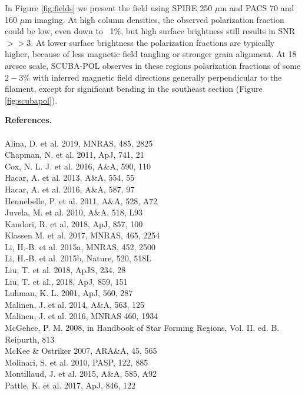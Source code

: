 \documentclass[11pt]{amsart}
\begin{document}
{In Figure \ref{fig:fields} we present the field using SPIRE 250 $\mu$m and PACS 70 and 160 $\mu$m imaging. At high column densities, the observed polarization fraction could be low, even down to ~1\%, but high surface brightness still results in SNR$>>$3. At lower surface brightness the polarization fractions are typically higher, because of less magnetic field tangling or stronger grain alignment. At 18 arcsec scale, SCUBA-POL observes in these regions polarization fractions of some $2-3\%$
with inferred magnetic field directions generally perpendicular to the filament, except for significant bending in the southeast section (Figure \ref{fig:scubapol}).


\clearpage

{\bf References.} 
\\
\\
Alina, D. et al.  2019,  MNRAS, 485, 2825 \\
Chapman, N. et al. 2011, ApJ, 741, 21 \\
Cox, N. L. J. et al. 2016, A\&A, 590, 110 \\
Hacar, A. et al. 2013, A\&A, 554, 55 \\
Hacar, A. et al. 2016, A\&A, 587, 97 \\
Hennebelle, P. et al. 2011, A\&A, 528, A72 \\
Juvela, M.  et al. 2010, A\&A, 518, L93 \\
Kandori, R. et al. 2018, ApJ, 857, 100 \\
Klassen M. et al. 2017, MNRAS, 465, 2254 \\
Li, H.-B. et al. 2015a, MNRAS, 452, 2500 \\
Li, H.-B. et al. 2015b, Nature, 520, 518L \\
Liu, T. et al. 2018, ApJS, 234, 28 \\
Liu, T. et al., 2018,  ApJ, 859, 151 \\
Luhman, K. L. 2001, ApJ, 560, 287 \\
Malinen, J. et al. 2014, A\&A, 563, 125 \\
Malinen, J. et al. 2016, MNRAS 460, 1934 \\
McGehee, P. M. 2008, in Handbook of Star Forming Regions, Vol. II, ed. B. Reipurth, 813 \\
McKee \& Ostriker 2007, ARA\&A, 45, 565 \\
Molinari, S.  et al. 2010, PASP,  122, 885 \\
Montillaud, J. et al. 2015, A\&A, 585, A92 \\
Pattle, K.  et al. 2017, ApJ, 846, 122 \\
}
\end{document}
